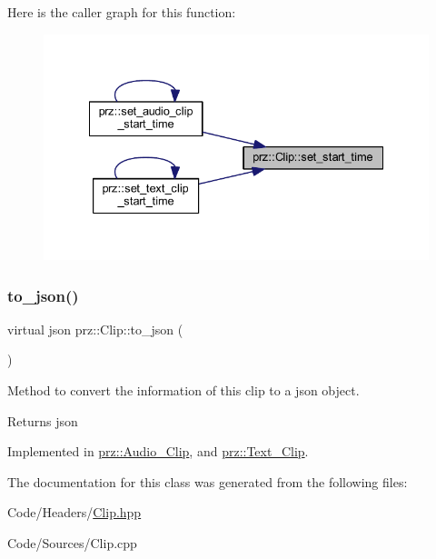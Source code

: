 Here is the caller graph for this function\+:
\nopagebreak
\begin{figure}[H]
\begin{center}
\leavevmode
\includegraphics[width=335pt]{classprz_1_1_clip_a7cbb55c3a344ab273d655f3b1e3fe5d1_icgraph}
\end{center}
\end{figure}
\mbox{\label{classprz_1_1_clip_a4959ada0fab0fbac6cb5239578ac3ec6}} 
\subsubsection{\texorpdfstring{to\_json()}{to\_json()}}
{\footnotesize\ttfamily virtual json prz\+::\+Clip\+::to\+\_\+json (\begin{DoxyParamCaption}{ }\end{DoxyParamCaption})\hspace{0.3cm}{\ttfamily [pure virtual]}}



Method to convert the information of this clip to a json object. 

\begin{DoxyReturn}{Returns}
json 
\end{DoxyReturn}


Implemented in \mbox{\hyperlink{classprz_1_1_audio___clip_a15fdef4e8547e25d06785d816be71a12}{prz\+::\+Audio\+\_\+\+Clip}}, and \mbox{\hyperlink{classprz_1_1_text___clip_a4e78e6e36c130ed42ec7f75772e3baed}{prz\+::\+Text\+\_\+\+Clip}}.



The documentation for this class was generated from the following files\+:\begin{DoxyCompactItemize}
\item 
Code/\+Headers/\mbox{\hyperlink{_clip_8hpp}{Clip.\+hpp}}\item 
Code/\+Sources/Clip.\+cpp\end{DoxyCompactItemize}
